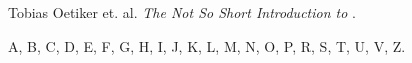 \documentclass[12pt, a4paper, onecolumn, titlepage, oneside, intlimits]{report}
\begin{document}
% 

\begin{ktuliterature}
\begin{thebibliography}{99}
     Tobias Oetiker et. al. \emph{The Not So 
       Short Introduction to \LaTeXe{}}.
\end{thebibliography}
\end{ktuliterature}

\clearpage

\begin{ktuappendices}

A, B, C, D, E, F, G, H, I, J, K, L, M, N, O, P, R, S, T, U, V, Z.

\end{ktuappendices}
\end{document}
